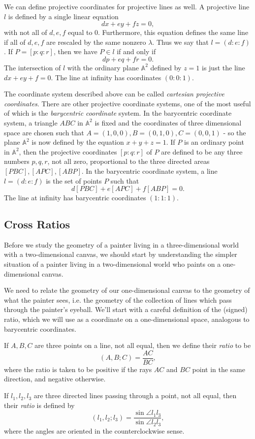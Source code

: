 We can define projective coordinates for projective lines as well. A projective line $l$ is defined by a single linear equation
\[
dx+ey+fz = 0,
\]
with not all of $d,e,f$ equal to $0$. Furthermore, this equation defines the same line if all of $d,e,f$ are rescaled by the same nonzero $\lambda$. Thus we say that $l = (d:e:f)$. If $P = [p:q:r]$, then we have $P\in l$ if and only if
\[
dp + eq+ fr = 0.
\]
The intersection of $l$ with the ordinary plane $\mathbb{A}^2$ defined by $z=1$ is just the line $dx+ey+f=0$. The line at infinity has coordinates $(0:0:1)$.

The coordinate system described above can be called \emph{cartesian projective coordinates}. There are other projective coordinate systems, one of the most useful of which is the \emph{barycentric coordinate} system. In the barycentric coordinate system, a triangle $ABC$ in $\mathbb{A}^2$ is fixed and the coordinates of three dimensional space are chosen such that $A=(1,0,0), B = (0,1,0), C = (0,0,1)$ - so the plane $\mathbb{A}^2$ is now defined by the equation $x+y+z = 1$. If $P$ is an ordinary point in $\mathbb{A}^2$, then the projective coordinates $[p:q:r]$ of $P$ are defined to be any three numbers $p,q,r$, not all zero, proportional to the three directed areas $[PBC], [APC], [ABP]$. In the barycentric coordinate system, a line $l=(d:e:f)$ is the set of points $P$ such that
\[
d[PBC] + e[APC] + f[ABP] = 0.
\]
The line at infinity has barycentric coordinates $(1:1:1)$.

\subsection{Cross Ratios}

Before we study the geometry of a painter living in a three-dimensional world with a two-dimensional canvas, we should start by understanding the simpler situation of a painter living in a two-dimensional world who paints on a one-dimensional canvas.

We need to relate the geometry of our one-dimensional canvas to the geometry of what the painter sees, i.e. the geometry of the collection of lines which pass through the painter's eyeball. We'll start with a careful definition of the (signed) ratio, which we will use as a coordinate on a one-dimensional space, analogous to barycentric coordinates.

\begin{defn} If $A,B,C$ are three points on a line, not all equal, then we define their \emph{ratio} to be
\[
(A,B;C) = \frac{AC}{BC},
\]
where the ratio is taken to be positive if the rays $AC$ and $BC$ point in the same direction, and negative otherwise.

If $l_1,l_2,l_3$ are three directed lines passing through a point, not all equal, then their \emph{ratio} is defined by
\[
(l_1,l_2;l_3) = \frac{\sin\angle l_1l_3}{\sin \angle l_2l_3},
\]
where the angles are oriented in the counterclockwise sense.
\end{defn}

